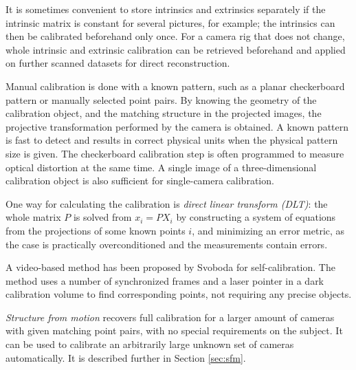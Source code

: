 It is sometimes convenient to store intrinsics and extrinsics separately if the intrinsic matrix is constant for several pictures, for example;
the intrinsics can then be calibrated beforehand only once.
For a camera rig that does not change, whole intrinsic and extrinsic calibration can be retrieved beforehand and applied on further scanned datasets for direct reconstruction.

Manual calibration is done with a known pattern, such as a planar checkerboard pattern \cite{chuang2002performance,zhang2000flexible} or manually selected point pairs.
By knowing the geometry of the calibration object, and the matching structure in the projected images, the projective transformation performed by the camera is obtained.
A known pattern is fast to detect and results in correct physical units when the physical pattern size is given.
The checkerboard calibration step is often programmed to measure optical distortion at the same time. \cite{opencv,camcalmatlab}
A single image of a three-dimensional calibration object is also sufficient for single-camera calibration. \cite[p. 181]{hartley03multiview}

One way for calculating the calibration is \emph{direct linear transform (DLT)}:
the whole matrix $P$ is solved from $x_i = PX_i$ by constructing a system of equations from the projections of some known points $i$, and minimizing an error metric, as the case is practically overconditioned and the measurements contain errors. \cite{hartley03multiview}

A video-based method has been proposed by Svoboda for self-calibration.
The method uses a number of synchronized frames and a laser pointer in a dark calibration volume to find corresponding points, not requiring any precise objects. \cite{svoboda2005convenient}

\emph{Structure from motion} recovers full calibration for a larger amount of cameras with given matching point pairs, with no special requirements on the subject.
It can be used to calibrate an arbitrarily large unknown set of cameras automatically.
It is described further in Section \ref{sec:sfm}.



